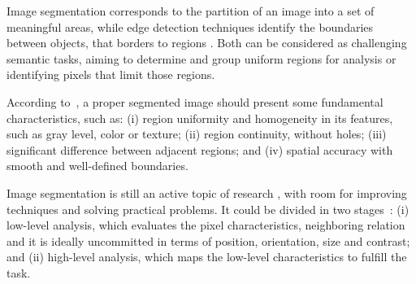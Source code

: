 


Image segmentation corresponds to the partition of an image into a set of meaningful areas, while edge detection techniques identify the boundaries between objects, that borders to regions \cite{Dominguez:2016} \cite{gonzalez2002digital}.
Both can be considered as challenging semantic tasks, aiming to determine and group uniform regions for analysis or identifying pixels that limit those regions.

According to~\cite{Dominguez:2016}, a proper segmented image should present some fundamental characteristics, such as: (i) region uniformity and homogeneity in  its features, such as gray level, color or texture; (ii) region continuity, without holes; (iii) significant difference between adjacent regions; and (iv) spatial accuracy with smooth and well-defined boundaries.

Image segmentation is still an active topic of research \cite{Khan:2020}, with room for improving techniques and solving practical problems.
It could be divided in two stages~\cite{Guigues:2006}: (i) low-level analysis, which evaluates the pixel characteristics, neighboring relation and it is ideally uncommitted in terms of position, orientation, size and contrast; and (ii) high-level analysis, which maps the low-level characteristics to fulfill the task.

